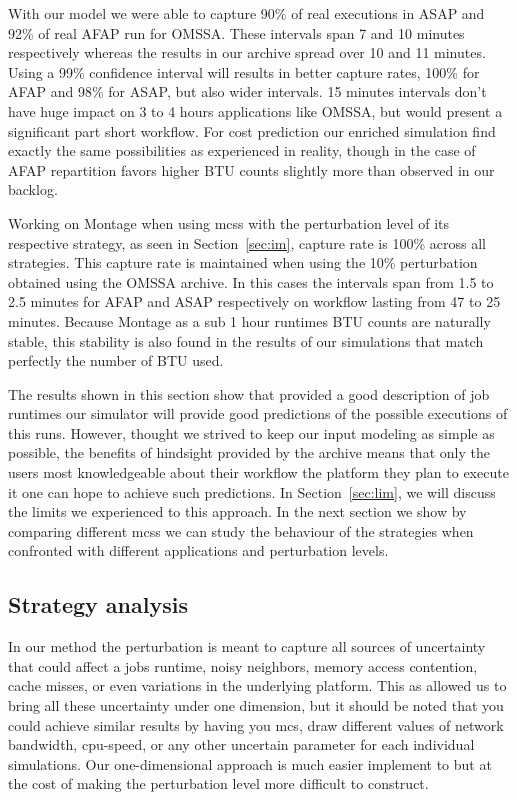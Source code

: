 \documentclass[10pt,conference,compsocconf]{IEEEtran}
\begin{document}
With our model we were able to capture 90\% of real executions in ASAP and
92\% of real AFAP run for OMSSA\@. These intervals span 7 and 10 minutes
respectively whereas the results in our archive spread over 10 and 11 minutes.
Using a 99\% confidence interval will results in better capture rates, 100\% for
AFAP and 98\% for ASAP, but also wider intervals. 15 minutes intervals don't
have huge impact on 3 to 4 hours applications like OMSSA, but would present a
significant part short workflow. For cost prediction our enriched simulation
find exactly the same possibilities as experienced in reality, though in the
case of AFAP repartition favors higher BTU counts slightly more than observed in
our backlog.

Working on Montage when using \acp{mcs} with the perturbation level of its
respective strategy, as seen in Section~\ref{sec:im}, capture rate is 100\%
across all strategies. This capture rate is maintained when using the 10\%
perturbation obtained using the OMSSA archive. In this cases the intervals span
from 1.5 to 2.5 minutes for AFAP and ASAP respectively on workflow lasting from
47 to 25 minutes. Because Montage as a sub 1 hour runtimes BTU counts are
naturally stable, this stability is also found in the results of our simulations
that match perfectly the number of BTU used.

The results shown in this section show that provided a good description of job
runtimes our simulator will provide good predictions of the possible executions
of this runs. However, thought we strived to keep our input modeling as simple
as possible, the benefits of hindsight provided by the archive means that only
the users most knowledgeable about their workflow the platform they plan to
execute it one can hope to achieve such predictions. In Section~\ref{sec:lim},
we will discuss the limits we experienced to this approach. In the next section
we show by comparing different \acp{mcs} we can study the behaviour of the
strategies when confronted with different applications and perturbation levels.


\subsection{Strategy analysis}\label{sec:sa}

In our method the perturbation is meant to capture all sources of uncertainty
that could affect a jobs runtime, noisy neighbors, memory access contention,
cache misses, or even variations in the underlying platform. This as allowed us
to bring all these uncertainty under one dimension, but it should be noted that
you could achieve similar results by having you \ac{mcs}, draw different values
of network bandwidth, cpu-speed, or any other uncertain parameter for each
individual simulations. Our one-dimensional approach is much easier implement to
but at the cost of making the perturbation level more difficult to construct.
\end{document}
